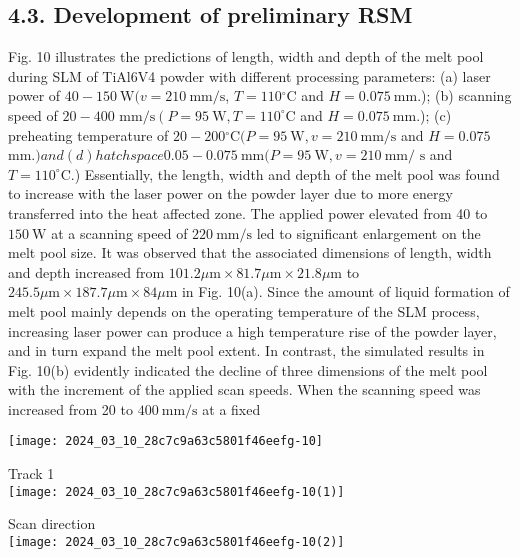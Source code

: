 \documentclass[10pt]{article}
\begin{document}
\subsection*{4.3. Development of preliminary RSM}
Fig. 10 illustrates the predictions of length, width and depth of the melt pool during SLM of TiAl6V4 powder with different processing parameters: (a) laser power of $40-150 \mathrm{~W}(v=210 \mathrm{~mm} / \mathrm{s}$, $T=110{ }^{\circ} \mathrm{C}$ and $H=0.075 \mathrm{~mm}$.); (b) scanning speed of $20-400$ $\mathrm{mm} / \mathrm{s}\left(P=95 \mathrm{~W}, T=110^{\circ} \mathrm{C}\right.$ and $H=0.075 \mathrm{~mm}$.); (c) preheating temperature of $20-200{ }^{\circ} \mathrm{C}(P=95 \mathrm{~W}, v=210 \mathrm{~mm} / \mathrm{s}$ and $H=0.075$ $\mathrm{mm}$.$) and (d) hatch space 0.05-0.075 \mathrm{~mm}(P=95 \mathrm{~W}, v=210 \mathrm{~mm} /$ $\mathrm{s}$ and $T=110^{\circ} \mathrm{C}$.) Essentially, the length, width and depth of the melt pool was found to increase with the laser power on the powder layer due to more energy transferred into the heat affected zone. The applied power elevated from 40 to $150 \mathrm{~W}$ at a scanning speed of $220 \mathrm{~mm} / \mathrm{s}$ led to significant enlargement on the melt pool size. It was observed that the associated dimensions of length, width and depth increased from $101.2 \mu \mathrm{m} \times 81.7 \mu \mathrm{m} \times 21.8 \mu \mathrm{m}$ to $245.5 \mu \mathrm{m} \times 187.7 \mu \mathrm{m} \times 84 \mu \mathrm{m}$ in Fig. 10(a). Since the amount of liquid formation of melt pool mainly depends on the operating temperature of the SLM process, increasing laser power can produce a high temperature rise of the powder layer, and in turn expand the melt pool extent. In contrast, the simulated results in Fig. 10(b) evidently indicated the decline of three dimensions of the melt pool with the increment of the applied scan speeds. When the scanning speed was increased from 20 to $400 \mathrm{~mm} / \mathrm{s}$ at a fixed

\begin{center}
\texttt{[image: 2024\_03\_10\_28c7c9a63c5801f46eefg-10]}
\end{center}

Track 1\\
\texttt{[image: 2024\_03\_10\_28c7c9a63c5801f46eefg-10(1)]}

Scan direction\\
\texttt{[image: 2024\_03\_10\_28c7c9a63c5801f46eefg-10(2)]}
\end{document}
